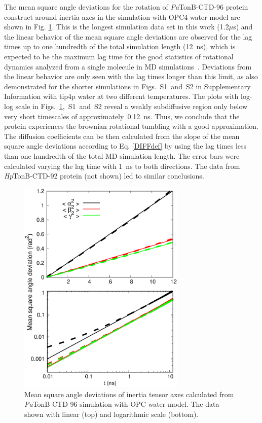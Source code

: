 \documentclass[journal=jpcbfk,manuscript=article]{achemso}
\begin{document}
The mean square angle deviations for the rotation of {\it Pa}TonB-CTD-96 protein construct
around inertia axes in the simulation with OPC4 water model
are shown in Fig. \ref{RMASDplot}. This is the longest
simulation data set in this work (1.2$\mu$s) and the
linear behavior of the mean square angle deviations are observed
for the lag times up to one hundredth of the total simulation length (12~ns),
which is expected to be the maximum lag time for the good statistics
of rotational dynamics analyzed from a single molecule in MD simulations~\cite{lu06}.
Deviations from the linear behavior are only seen with the lag times longer
than this limit, as also demonstrated for the shorter simulations in
Figs.~S1~and~S2 in Supplementary Information with tip4p water at
two different temperatures. The plots with log-log scale in
Figs.~\ref{RMASDplot},~S1~and~S2
reveal a weakly subdiffusive region only below very short timescales
of approximately~0.12~ns. Thus, we conclude that the protein
experiences the brownian rotational tumbling with  a good approximation.
The diffusion coefficients can be then calculated from the slope of the mean square angle
deviations according to Eq. \ref{DIFFdef} by using the lag times less than
one hundredth of the total MD simulation length.
The error bars were calculated varying the lag time with 1~ns to both directions.
The data from {\it Hp}TonB-CTD-92 protein (not shown) led to similar conclusions.
\begin{figure}[htb]
  \includegraphics[width=8.0cm]{../Figs/RMASDplotPsTonBOPC4.eps}%
  \caption{Mean square angle deviations of inertia tensor axes calculated from
    {\it Pa}TonB-CTD-96 simulation with OPC water model. The data shown with linear (top) and logarithmic scale (bottom).
    \label{RMASDplot}}%
\end{figure}
\end{document}
